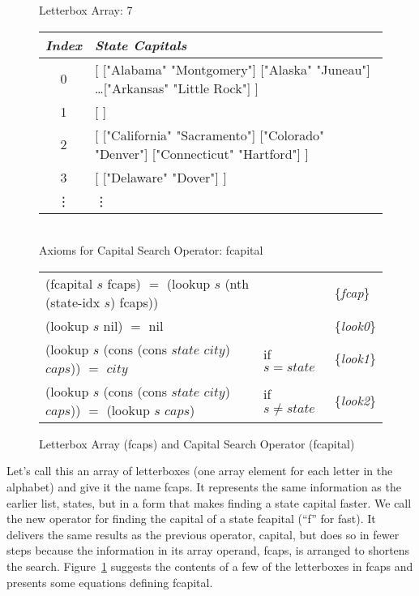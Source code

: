 \begin{figure}
\begin{center}
Letterbox Array: \textsf{7}
\begin{tabular}{c|l}
\emph{Index} &\emph{State Capitals} \\
\hline
0 & \textsf{[ ["Alabama"  "Montgomery"] ["Alaska"   "Juneau"] \dots ["Arkansas"  "Little Rock"] ]}  \\ %
1 & \textsf{[ ]}\\
2 & \textsf{[ ["California"  "Sacramento"] ["Colorado"  "Denver"] ["Connecticut"  "Hartford"] }]\\
3 & \textsf{[ ["Delaware"  "Dover"] ]}\\
\vdots & \hspace*{15mm}\vdots\\
\end{tabular}
\vspace{2mm}\\
Axioms for Capital Search Operator: \textsf{fcapital}\\
\begin{tabular}{lll}
\textsf{(fcapital} $s$ \textsf{fcaps)} $=$ \textsf{(lookup} $s$ \textsf{(nth (state-idx} $s$) \textsf{fcaps))} && \{\emph{fcap}\} \\
\textsf{(lookup} $s$ \textsf{nil)} $=$ \textsf{nil}  && \{\emph{look0}\}     \\
\textsf{(lookup} $s$ \textsf{(cons (cons} $state$ $city$\textsf{)} $caps$\textsf{))} $=$ $city$ &if $s = state$ & \{\emph{look1}\} \\
\textsf{(lookup} $s$ \textsf{(cons (cons} $state$ $city$) $caps$\textsf{))} $=$ \textsf{(lookup} $s$ $caps$\textsf{)} &if $s \ne state$ & \{\emph{look2}\} \\
\end{tabular}
\end{center}
\caption{Letterbox Array (\textsf{fcaps}) and Capital Search Operator (\textsf{fcapital})}
\label{fig:fcaps-array}
\end{figure}

Let's call this an array of letterboxes
(one array element for each letter in the alphabet)
and give it the name \textsf{fcaps}.
It represents the same information as the earlier list, \textsf{states},
but in a form that makes finding a state capital faster.
We call the new operator for finding the capital of a state
\textsf{fcapital} (``f'' for fast).
It delivers the same results
as the previous operator, \textsf{capital},
but does so in fewer steps because the information in its array operand,
\textsf{fcaps}, is arranged to shortens the search.
Figure~\ref{fig:fcaps-array} suggests the contents of a few
of the letterboxes in \textsf{fcaps} and presents some
equations defining \textsf{fcapital}.

